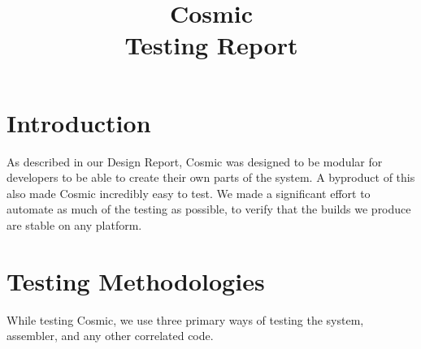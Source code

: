 \documentclass[conference]{IEEEtran}
\begin{document}
\title{
 Cosmic\\Testing Report}

\author{
\and
{}

}

\maketitle

\section{Introduction}
As described in our Design Report, Cosmic was designed to be modular for developers to be able to create their own parts of the system. A byproduct of this also made Cosmic incredibly easy to test. We made a significant effort to automate as much of the testing as possible, to verify that the builds we produce are stable on any platform. 
\section{Testing Methodologies}
While testing Cosmic, we use three primary ways of testing the system, assembler, and any other correlated code.
\end{document}
